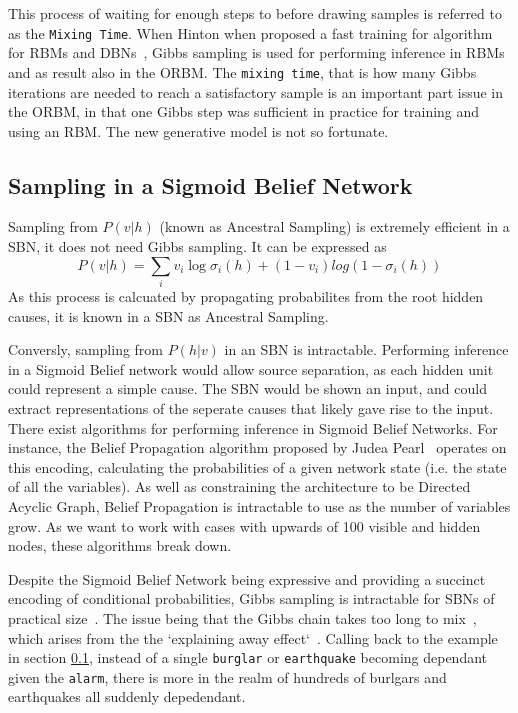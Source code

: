 This process of waiting for enough steps to before drawing samples is referred to as the \texttt{Mixing Time}. When Hinton when proposed a fast training for algorithm for RBMs and DBNs~\cite{Hinton:2006:FLA:1161603.1161605}, Gibbs sampling is used for performing inference in RBMs and as result also in the ORBM. The \texttt{mixing time}, that is how many Gibbs iterations are needed to reach a satisfactory sample is an important part issue in the ORBM, in that one Gibbs step was sufficient in practice for training and using an RBM. The new generative model is not so fortunate.



\subsection{Sampling in a Sigmoid Belief Network}


Sampling from $ P(v|h) $ (known as Ancestral Sampling) is extremely efficient in a SBN, it does not need Gibbs sampling. It can be expressed as
\begin{equation}\label{eq:SBN-v-given-h}
P(v|h) = \sum_i v_i \log \sigma_i(h) + (1-v_i)log(1-\sigma_i(h))
\end{equation}
As this process is calcuated by propagating probabilites from the root hidden causes, it is known in a SBN as Ancestral Sampling.

Conversly, sampling from $P(h|v)$ in an SBN is intractable. Performing inference in a Sigmoid Belief network would allow source separation, as each hidden unit could represent a simple cause. The SBN would be shown an input, and could extract representations of the seperate causes that likely gave rise to the input. There exist algorithms for performing inference in Sigmoid Belief Networks. For instance, the Belief Propagation algorithm proposed by Judea Pearl~\cite{Pearl1982} operates on this encoding, calculating the probabilities of a given network state (i.e. the state of all the variables). As well as constraining the architecture to be Directed Acyclic Graph, Belief Propagation is intractable to use as the number of variables grow\todocite{}. As we want to work with cases with upwards of 100 visible and hidden nodes, these algorithms break down.

Despite the Sigmoid Belief Network being expressive and providing a succinct encoding of conditional probabilities, Gibbs sampling is intractable for SBNs of practical size~\cite{Jensen95blockinggibbs}. The issue being that the Gibbs chain takes too long to mix~\cite{neal1992:connectionist}, which arises from the the `explaining away effect`~\cite{Hinton:2006:FLA:1161603.1161605}. Calling back to the example in section \ref{}, instead of a single \texttt{burglar} or \texttt{earthquake} becoming dependant given the \texttt{alarm}, there is more in the realm of hundreds of burlgars and earthquakes all suddenly depedendant.

